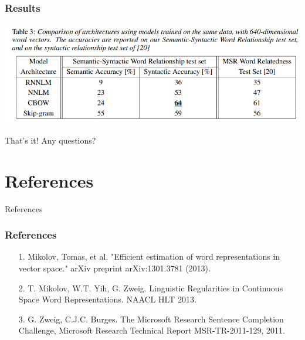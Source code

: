 \documentclass[aspectratio=169]{beamer}
\begin{document}
\begin{frame}
\frametitle{Results}

\begin{center}
\includegraphics[scale=0.5]{results.png}
\end{center}

\end{frame}

\begin{frame}
\begin{center}

That's it! Any questions?

\end{center}
\end{frame}

\section{References}
\begin{frame}{References}
\frametitle{References}

\begin{itemize}
\item[1.] Mikolov, Tomas, et al. "Efficient estimation of word representations in vector space." arXiv preprint arXiv:1301.3781 (2013).
\item[2.] T. Mikolov, W.T. Yih, G. Zweig. Linguistic Regularities in Continuous Space Word Representations. NAACL HLT 2013.
\item[3.] G. Zweig, C.J.C. Burges. The Microsoft Research Sentence Completion Challenge, Microsoft
Research Technical Report MSR-TR-2011-129, 2011.
\end{itemize}
\end{frame}
\end{document}
